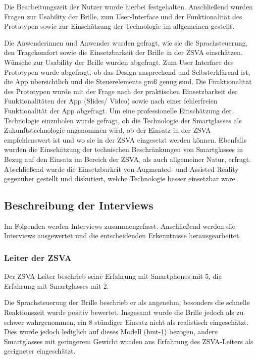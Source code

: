 Die Bearbeitungszeit der Nutzer wurde hierbei festgehalten. Anschließend wurden Fragen zur Usability der Brille, zum User-Interface und der Funktionalität des Prototypen sowie zur Einschätzung der Technologie im allgemeinen gestellt.

Die Anwenderinnen und Anwender wurden gefragt, wie sie die Sprachsteuerung, den Tragekomfort sowie die Einsetzbarkeit der Brille in der ZSVA einschätzen. Wünsche zur Usability der Brille wurden abgefragt. Zum User Interface des Prototypen wurde abgefragt, ob das Design ansprechend und Selbsterklärend ist, die App übersichtlich und die Steuerelemente groß genug sind. Die Funktionalität des Prototypen wurde mit der Frage nach der praktischen Einsetzbarkeit der Funktionalitäten der App (Slides/ Video) sowie nach einer fehlerfreien Funktionalität der App abgefragt. Um eine professionelle Einschätzung der Technologie einzuholen wurde gefragt, ob die Technologie der Smartglasses als Zukunftstechnologie angenommen wird, ob der Einsatz in der ZSVA empfehlenswert ist und wo sie in der ZSVA eingesetzt werden können. Ebenfalls wurden die Einschätzung der technischen Beschränkungen von Smartglasses in Bezug auf den Einsatz im Bereich der ZSVA, als auch allgemeiner Natur, erfragt. Abschließend wurde die Einsetzbarkeit von Augmented- und Assisted Reality gegenüber gestellt und diskutiert, welche Technologie besser einsetzbar wäre.
%
%
%
%
%
%
%
\subsection{Beschreibung der Interviews}
Im Folgenden werden Interviews zusammengefasst. Anschließend werden die Interviews ausgewertet und die entscheidenden Erkenntnisse herausgearbeitet.
\label{sec:Beschreinung_der_Interviews}
%
%
\subsubsection{Leiter der ZSVA}
%
Der ZSVA-Leiter beschrieb seine Erfahrung mit Smartphones mit 5, die Erfahrung mit Smartglasses mit 2.

Die Sprachsteuerung der Brille beschrieb er als angenehm, besonders die schnelle Reaktionszeit wurde positiv bewertet. Insgesamt wurde die Brille jedoch als zu schwer wahrgenommen, ein 8 stündiger Einsatz nicht als realistisch eingeschätzt. Dies wurde jedoch lediglich auf dieses Modell (hmt-1) bezogen, andere Smartglasses mit geringerem Gewicht wurden aus Erfahrung des ZSVA-Leiters als geeigneter eingeschätzt.

